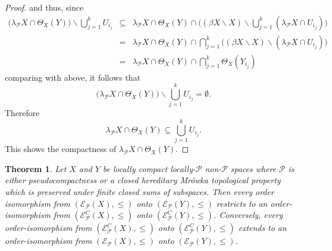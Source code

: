 \documentclass{amsart}
\newtheorem{theorem}{Theorem}[section]
\theoremstyle{definition}
\theoremstyle{remark}
\theoremstyle{notation}
\numberwithin{equation}{section}
\begin{document}
\begin{proof}
and thus, since
\begin{eqnarray*}
\big(\lambda_{{\mathcal P}} X\cap\Theta_X(Y)\big)\backslash\bigcup_{j=1}^kU_{i_j}&\subseteq&\lambda_{{\mathcal P}} X\cap\Theta_X(Y)\cap
\Big((\beta X\backslash X)\backslash\bigcup_{j=1}^k(\lambda_{{\mathcal P}} X\cap U_{i_j})\Big)\\&=&\lambda_{{\mathcal P}} X\cap\Theta_X(Y)\cap\bigcap_{j=1}^k
\big((\beta X\backslash X)\backslash(\lambda_{{\mathcal P}} X\cap U_{i_j})\big)\\&=&\lambda_{{\mathcal P}} X\cap\Theta_X(Y)\cap\bigcap_{j=1}^k\Theta_X(Y_{i_j})
\end{eqnarray*}
comparing with above, it follows that
\[\big(\lambda_{{\mathcal P}} X\cap\Theta_X(Y)\big)\backslash\bigcup_{j=1}^kU_{i_j}=\emptyset.\]
Therefore
\[\lambda_{{\mathcal P}} X\cap\Theta_X(Y)\subseteq \bigcup_{j=1}^kU_{i_j}.\]
This shows the compactness of  $\lambda_{{\mathcal P}} X\cap\Theta_X(Y)$.
\end{proof}

\begin{theorem}\label{JOOGF}
Let $X$ and $Y$ be locally compact locally-${\mathcal P}$ non-${\mathcal P}$  spaces  where  ${\mathcal P}$ is either pseudocompactness or a
closed hereditary Mr\'{o}wka topological  property which is preserved under  finite closed sums of subspaces.
Then every order isomorphism from $({\mathscr E}_{{\mathcal P}}(X),\leq)$ onto $({\mathscr E}_{{\mathcal P}}(Y),\leq)$ restricts to
an  order-isomorphism from $({\mathscr E}^C_{{\mathcal P}}(X),\leq)$ onto $({\mathscr E}^C_{{\mathcal P}}(Y),\leq)$. Conversely,
every order-isomorphism from
$({\mathscr E}^C_{{\mathcal P}}(X),\leq)$ onto $({\mathscr E}^C_{{\mathcal P}}(Y),\leq)$ extends to an order-isomorphism from
$({\mathscr E}_{{\mathcal P}}(X),\leq)$ onto $({\mathscr E}_{{\mathcal P}}(Y),\leq)$.
\end{theorem}
\end{document}
